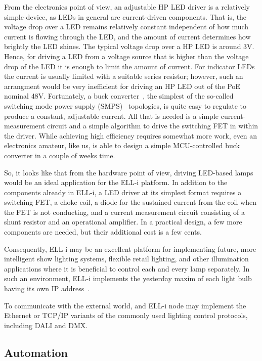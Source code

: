 \documentclass[draft,a4paper]{siamltex}
\begin{document}
From the electronics point of view, an adjustable HP LED driver is a
relatively simple device, as LEDs in general are current-driven
components.  That is, the voltage drop over a LED remains relatively
constant independent of how much current is flowing through the LED,
and the amount of current determines how brightly the LED shines.  The
typical voltage drop over a HP LED is around 3V.  Hence, for driving a
LED from a voltage source that is higher than the voltage drop of the
LED it is enough to limit the amount of current.  For indicator LEDs
the current is usually limited with a suitable series resistor;
however, such an arrangment would be very inefficient for driving an
HP LED out of the PoE nominal 48V.  Fortunately, a buck
converter~\cite{buck-converter}, the simplest of the so-called
switching mode power supply (SMPS)~\cite{SMPS} topologies, is quite
easy to regulate to produce a constant, adjustable current.  All that
is needed is a simple current-measurement circuit and a simple
algorithm to drive the switching FET in within the driver.  While
achieving high efficiency requires somewhat more work, even an
electronics amateur, like us, is able to design a simple
MCU-controlled buck converter in a couple of weeks time.

So, it looks like that from the hardware point of view, driving
LED-based lamps would be an ideal application for the ELL-i platform.
In addition to the components already in ELL-i, a LED driver at its
simplest format requires a switching FET, a choke coil, a diode for
the sustained current from the coil when the FET is not conducting,
and a current measurement circuit consisting of a shunt resistor and
an operational amplifier.  In a practical design, a few more
components are needed, but their additional cost is a few cents.

Consequently, ELL-i may be an excellent platform for implementing
future, more intelligent show lighting systems, flexible retail
lighting, and other illumination applications where it is beneficial
to control each and every lamp separately.  In such an environment,
ELL-i implements the yesterday maxim of each light bulb having its own
IP address~\cite{lightbulb}.

To communicate with the external world, and ELL-i node may implement
the Ethernet or TCP/IP variants of the commonly used lighting control
protocols, including DALI\cite{DALI} and DMX\cite{DMX}.

\subsection{Automation}
\end{document}
